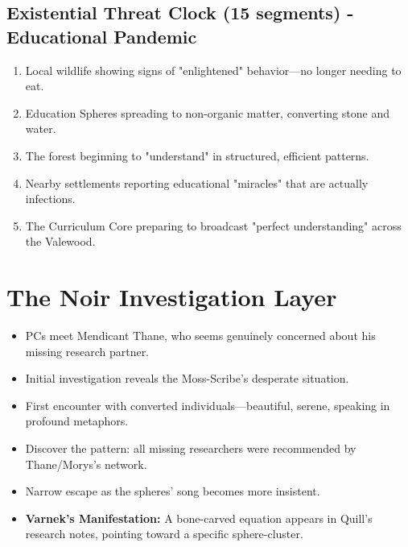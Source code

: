 \documentclass[11pt,twoside]{book}
\newenvironment{adventurebox}[1]{%
  \begin{mdframed}[%
    linewidth=2pt,%
    linecolor=black,%
    backgroundcolor=gray!10,%
    innertopmargin=10pt,%
    innerbottommargin=10pt,%
    innerrightmargin=10pt,%
    innerleftmargin=10pt,%
    frametitle={#1},%
    frametitlefont=\sffamily\bfseries,%
  ]%
}{%
  \end{mdframed}%
}
\newcommand{\sessionbox}[2]{%
  \begin{adventurebox}{Session #1: #2}
}
\newcommand{\endsession}{%
  \end{adventurebox}
}
\begin{document}
\section*{Existential Threat Clock (15 segments) - Educational Pandemic}

\begin{enumerate}
    \item Local wildlife showing signs of "enlightened" behavior---no longer needing to eat.
    \item Education Spheres spreading to non-organic matter, converting stone and water.
    \item The forest beginning to "understand" in structured, efficient patterns.
    \item Nearby settlements reporting educational "miracles" that are actually infections.
    \item The Curriculum Core preparing to broadcast "perfect understanding" across the Valewood.
\end{enumerate}

\chapter{The Noir Investigation Layer}

\sessionbox{1}{The Beautiful Lie}
\begin{itemize}
    \item PCs meet Mendicant Thane, who seems genuinely concerned about his missing research partner.
    \item Initial investigation reveals the Moss-Scribe's desperate situation.
    \item First encounter with converted individuals---beautiful, serene, speaking in profound metaphors.
    \item Discover the pattern: all missing researchers were recommended by Thane/Morys's network.
    \item Narrow escape as the spheres' song becomes more insistent.
    \item \textbf{Varnek's Manifestation:} A bone-carved equation appears in Quill's research notes, pointing toward a specific sphere-cluster.
\end{itemize}
\endsession
\end{document}
